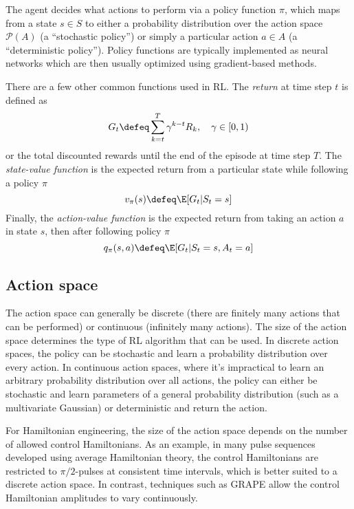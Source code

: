 \documentclass[twocolumn, aps, 10pt]{revtex4-2}
\begin{document}
The agent decides what actions to perform via a policy function $\pi$, which maps from a state $s \in S$ to either a probability distribution over the action space $\mathcal{P}(A)$ (a ``stochastic policy'') or simply a particular action $a \in A$ (a ``deterministic policy''). Policy functions are typically implemented as neural networks which are then usually optimized using gradient-based methods.

There are a few other common functions used in RL. The \emph{return} at time step $t$ is defined as
\begin{equation}\label{eq:return}
    G_t \defeq \sum_{k=t}^T \gamma^{k-t} R_k, \quad \gamma \in [0,1)
\end{equation}
or the total discounted rewards until the end of the episode at time step $T$. The \emph{state-value function} is the expected return from a particular state while following a policy $\pi$
\begin{equation}\label{eq:state_value}
    v_\pi(s) \defeq \E[G_t | S_t = s]
\end{equation}
Finally, the \emph{action-value function} is the expected return from taking an action $a$ in state $s$, then after following policy $\pi$
\begin{equation}\label{eq:action_value}
    q_\pi(s, a) \defeq \E[G_t | S_t = s, A_t = a]
\end{equation}


\subsection{Action space}

The action space can generally be discrete (there are finitely many actions that can be performed) or continuous  (infinitely many actions). The size of the action space determines the type of RL algorithm that can be used. In discrete action spaces, the policy can be stochastic and learn a probability distribution over every action. In continuous action spaces, where it's impractical to learn an arbitrary probability distribution over all actions, the policy can either be stochastic and learn parameters of a general probability distribution (such as a multivariate Gaussian) or deterministic and return the action.

For Hamiltonian engineering, the size of the action space depends on the number of allowed control Hamiltonians. As an example, in many pulse sequences developed using average Hamiltonian theory, the control Hamiltonians are restricted to $\pi/2$-pulses at consistent time intervals, which is better suited to a discrete action space. In contrast, techniques such as GRAPE
\cite{Khaneja-2005}
allow the control Hamiltonian amplitudes to vary continuously.
\end{document}
